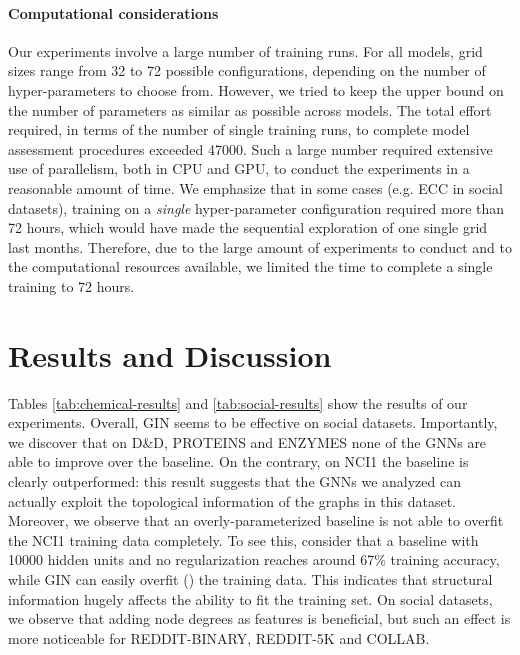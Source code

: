 \documentclass{article}
\begin{document}
\paragraph{Computational considerations}
Our experiments involve a large number of training runs. For all models, grid sizes range from 32 to 72 possible configurations, depending on the number of hyper-parameters to choose from. However, we tried to keep the upper bound on the number of parameters as similar as possible across models. 
The total effort required, in terms of the number of single training runs, to complete model assessment procedures exceeded 47000. Such a large number required extensive use of parallelism, both in CPU and GPU, to conduct the experiments in a reasonable amount of time. We emphasize that in some cases (e.g. ECC in social datasets), training on a \emph{single} hyper-parameter configuration required more than 72 hours, which would have made the sequential exploration of one single grid last months. Therefore, due to the large amount of experiments to conduct and to the computational resources available, we limited the time to complete a single training to 72 hours. \section{Results and Discussion}
Tables \ref{tab:chemical-results} and \ref{tab:social-results} show the results of our experiments. Overall, GIN seems to be effective on social datasets. Importantly, we discover that on D\&D, PROTEINS and ENZYMES none of the GNNs are able to improve over the baseline. On the contrary, on NCI1 the baseline is clearly outperformed: this result suggests that the GNNs we analyzed can actually exploit the topological information of the graphs in this dataset. Moreover, we observe that an overly-parameterized baseline is not able to overfit the NCI1 training data completely. To see this, consider that a baseline with 10000 hidden units and no regularization reaches around 67\% training accuracy, while GIN can easily overfit () the training data. This indicates that structural information hugely affects the ability to fit the training set. 
On social datasets, we observe that adding node degrees as features is beneficial, but such an effect is more noticeable for REDDIT-BINARY, REDDIT-5K and COLLAB. 
\end{document}
